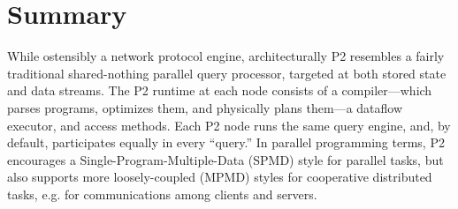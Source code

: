 

\section{Summary}
\label{ch:p2:sec:summary}

While ostensibly a network protocol engine, architecturally P2 resembles a
fairly traditional shared-nothing parallel query processor, targeted at both
stored state and data streams.  The P2 runtime at each node consists of a
compiler---which parses programs, optimizes them, and physically plans them---a
dataflow executor, and access methods.  Each P2 node runs the same query
engine, and, by default, participates equally in every ``query.'' In parallel
programming terms, P2 encourages a Single-Program-Multiple-Data (SPMD) style
for parallel tasks, but also supports more loosely-coupled (MPMD) styles for
cooperative distributed tasks, e.g.  for communications among clients and
servers.


